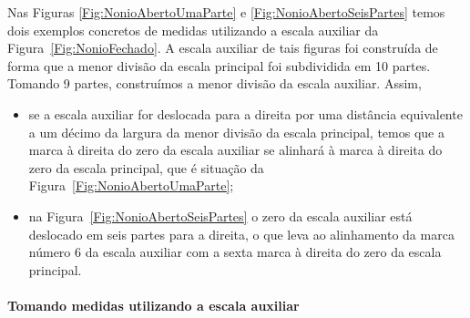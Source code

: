 \begin{marginfigure}
\centering
{}
\caption{Escala auxiliar deslocada por 6 décimos da largura da menor divisão da escala superior. Note o alinhamento da marca número 6.\label{Fig:NonioAbertoSeisPartes}}
\end{marginfigure}

Nas Figuras \ref{Fig:NonioAbertoUmaParte} e \ref{Fig:NonioAbertoSeisPartes} temos dois exemplos concretos de medidas utilizando a escala auxiliar da Figura~\ref{Fig:NonioFechado}. A escala auxiliar de tais figuras foi construída de forma que a menor divisão da escala principal foi subdividida em 10 partes. Tomando 9 partes, construímos a menor divisão da escala auxiliar. Assim, 
\begin{itemize}
	\item se a escala auxiliar for deslocada para a direita por uma distância equivalente a um décimo da largura da menor divisão da escala principal, temos que a marca à direita do zero da escala auxiliar se alinhará à marca à direita do zero da escala principal, que é situação da Figura~\ref{Fig:NonioAbertoUmaParte};
	\item na Figura~\ref{Fig:NonioAbertoSeisPartes} o zero da escala auxiliar está deslocado em seis partes para a direita, o que leva ao alinhamento da marca número 6 da escala auxiliar com a sexta marca à direita do zero da escala principal.
\end{itemize}

\paragraph{Tomando medidas utilizando a escala auxiliar}

